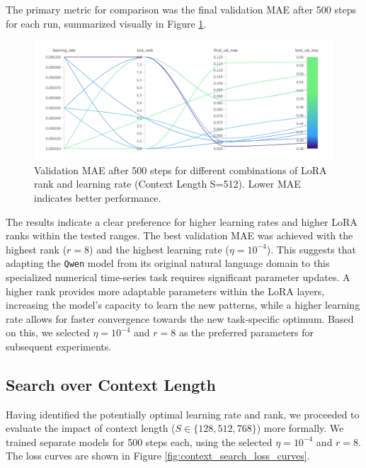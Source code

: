 \documentclass{article}
\begin{document}
The primary metric for comparison was the final validation MAE after 500 steps for each run, summarized visually in Figure \ref{fig:grid_search_lr_rank_results}.

\begin{figure}[!htbp] 
    \centering
    \includegraphics[width=0.8\linewidth]{M2 Course Work//Images/grid_search_result.png}
    \caption{Validation MAE after 500 steps for different combinations of LoRA rank and learning rate (Context Length S=512). Lower MAE indicates better performance.}
    \label{fig:grid_search_lr_rank_results} %
\end{figure}

The results indicate a clear preference for higher learning rates and higher LoRA ranks within the tested ranges. The best validation MAE was achieved with the highest rank ($r=8$) and the highest learning rate ($\eta=10^{-4}$). This suggests that adapting the \texttt{Qwen} model from its original natural language domain to this specialized numerical time-series task requires significant parameter updates. A higher rank provides more adaptable parameters within the LoRA layers, increasing the model's capacity to learn the new patterns, while a higher learning rate allows for faster convergence towards the new task-specific optimum. Based on this, we selected $\eta=10^{-4}$ and $r=8$ as the preferred parameters for subsequent experiments.

\subsection{Search over Context Length}

Having identified the potentially optimal learning rate and rank, we proceeded to evaluate the impact of context length ($S \in \{128, 512, 768\}$) more formally. We trained separate models for 500 steps each, using the selected $\eta=10^{-4}$ and $r=8$. The loss curves are shown in Figure \ref{fig:context_search_loss_curves}.
\end{document}
